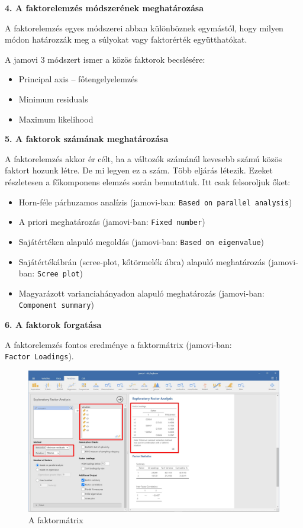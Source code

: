 \documentclass[
  letterpaper,
]{krantz}
\providecommand{\tightlist}{%
  \setlength{\itemsep}{0pt}\setlength{\parskip}{0pt}}\usepackage{longtable,booktabs,array}
\begin{document}
\textbf{4. A faktorelemzés módszerének meghatározása}

A faktorelemzés egyes módszerei abban különböznek egymástól, hogy milyen
módon határozzák meg a súlyokat vagy faktorérték együtthatókat.

A jamovi 3 módszert ismer a közös faktorok becslésére:

\begin{itemize}
\tightlist
\item
  Principal axis -- főtengelyelemzés
\item
  Minimum residuals
\item
  Maximum likelihood
\end{itemize}

\textbf{5. A faktorok számának meghatározása}

A faktorelemzés akkor ér célt, ha a változók számánál kevesebb számú
közös faktort hozunk létre. De mi legyen ez a szám. Több eljárás
létezik. Ezeket részletesen a főkomponens elemzés során bemutattuk. Itt
csak felsoroljuk őket:

\begin{itemize}
\tightlist
\item
  Horn-féle párhuzamos analízis (jamovi-ban:
  \texttt{Based\ on\ parallel\ analysis})
\item
  A priori meghatározás (jamovi-ban: \texttt{Fixed\ number})
\item
  Sajátértéken alapuló megoldás (jamovi-ban:
  \texttt{Based\ on\ eigenvalue})
\item
  Sajátértékábrán (scree-plot, kőtörmelék ábra) alapuló meghatározás
  (jamovi-ban: \texttt{Scree\ plot})
\item
  Magyarázott varianciahányadon alapuló meghatározás (jamovi-ban:
  \texttt{Component\ summary})
\end{itemize}

\textbf{6. A faktorok forgatása}

A faktorelemzés fontos eredménye a faktormátrix (jamovi-ban:
\texttt{Factor\ Loadings}).

\begin{figure}

{\centering \includegraphics{./images/efa_fogkrem_03.jpg}

}

\caption{A faktormátrix}

\end{figure}
\end{document}
